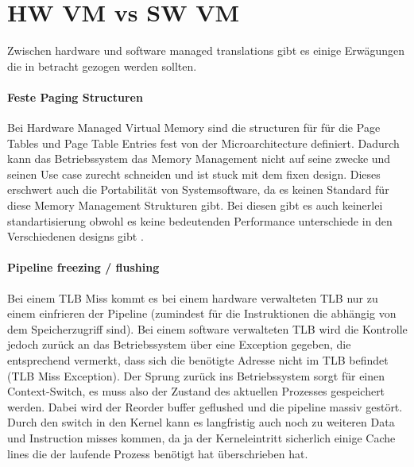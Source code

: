 \section{HW VM vs SW VM}
Zwischen hardware und software managed translations gibt es einige Erwägungen die in betracht
gezogen werden sollten.

\paragraph{Feste Paging Structuren} Bei Hardware Managed Virtual Memory sind die structuren für
für die Page Tables und Page Table Entries fest von der Microarchitecture definiert.
Dadurch kann das Betriebssystem das Memory Management nicht auf seine zwecke und seinen Use case
zurecht schneiden und ist stuck mit dem fixen design.
Dieses erschwert auch die Portabilität von Systemsoftware, da es keinen Standard für diese
Memory Management Strukturen gibt.
Bei diesen gibt es auch keinerlei standartisierung obwohl es keine bedeutenden Performance unterschiede
in den Verschiedenen designs  gibt \cite{jacob1998look}.

\paragraph{Pipeline freezing / flushing} Bei einem TLB Miss  kommt es bei
einem hardware verwalteten TLB nur zu einem einfrieren der Pipeline (zumindest für die Instruktionen
die abhängig von dem Speicherzugriff sind). Bei einem software verwalteten TLB wird die Kontrolle
jedoch zurück an das Betriebssystem über eine Exception gegeben, die entsprechend vermerkt,
dass sich die benötigte Adresse nicht im TLB befindet (TLB Miss Exception).
Der Sprung zurück ins Betriebssystem sorgt für einen Context-Switch, es muss also der Zustand
des aktuellen Prozesses gespeichert werden. Dabei wird der Reorder buffer geflushed und die
pipeline massiv gestört. Durch den switch in den Kernel kann es langfristig auch noch zu weiteren
Data und Instruction misses kommen, da ja der Kerneleintritt sicherlich einige Cache lines die der
laufende Prozess benötigt hat überschrieben hat.

